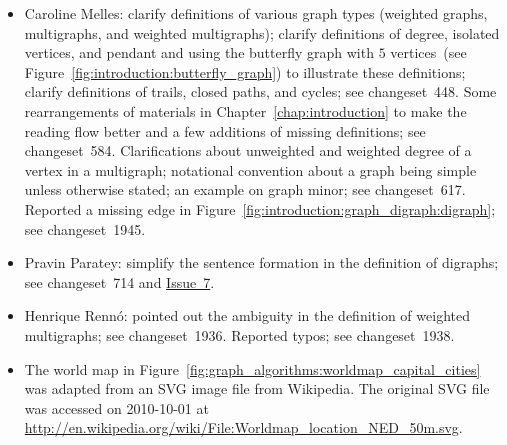 \begin{itemize}
\item Caroline Melles: clarify definitions of various graph types
  (weighted graphs, multigraphs, and weighted multigraphs); clarify
  definitions of degree, isolated vertices, and pendant and using the
  butterfly graph with $5$ vertices~(see
  Figure~\ref{fig:introduction:butterfly_graph}) to
  illustrate these definitions; clarify definitions of trails, closed
  paths, and cycles; see changeset~448. Some rearrangements of
  materials in Chapter~\ref{chap:introduction} to make the reading
  flow better and a few additions of missing definitions; see
  changeset~584. Clarifications about unweighted and weighted
  degree of a vertex in a multigraph; notational convention about a
  graph being simple unless otherwise stated; an example on graph
  minor; see changeset~617.  Reported a missing edge in
  Figure~\ref{fig:introduction:graph_digraph:digraph}; see
  changeset~1945.

\item Pravin Paratey: simplify the sentence formation in the definition
  of digraphs; see changeset~714 and
  \href{http://code.google.com/p/graph-theory-algorithms-book/issues/detail?id=7}{Issue~7}.

\item Henrique Renn\'o: pointed out the ambiguity in the definition of
  weighted multigraphs; see changeset~1936.  Reported typos; see
  changeset~1938.

\item The world map in
  Figure~\ref{fig:graph_algorithms:worldmap_capital_cities} was
  adapted from an SVG image file from Wikipedia. The original SVG file
  was accessed on 2010-10-01 at
  \url{http://en.wikipedia.org/wiki/File:Worldmap_location_NED_50m.svg}.
\end{itemize}
